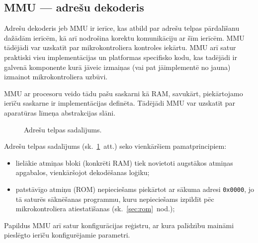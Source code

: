 

\subsection{MMU — adrešu dekoderis} \label{sec:mmu}
	Adrešu dekoderis jeb MMU ir ierīce, kas atbild par adrešu telpas
	pārdalīšanu dažādām ierīcēm, kā arī nodrošina korektu komunikāciju
	ar šīm ierīcēm. MMU tādējādi var uzskatīt par mikrokontroliera kontroles
	iekārtu. MMU arī satur praktiski visu implementācijas un platformas
	specifisko kodu, kas tadējādi ir galvenā komponente kurā jāveic izmaiņas
	(vai pat jāimplementē no jauna) izmainot mikrokontroliera uzbūvi.
	
	MMU ar procesoru veido tādu pašu saskarni kā RAM,
	savukārt, piekārtojamo ierīču saskarne ir implementācijas definēta.
	Tādējādi MMU var uzskatīt par aparatūras līmeņa abstrakcijas slāni.
	
	\begin{figure}[thp]
		\centering
		\def\svgwidth{0.9\textwidth}
		{\ttfamily\small}
		\caption{Adrešu telpas sadalījums.}
		\label{fig:memory-map}
	\end{figure}
	
	Adrešu telpas sadalījums (sk.~\ref{fig:memory-map}~att.) seko vienkāršiem pamatprincipiem:
	\begin{itemize}
		\item lielākie atmiņas bloki (konkrēti RAM) tiek novietoti augstākos
			atmiņas apgabalos, vienkāršojot dekodēšanas loģiku;
		\item patstāvīgo atmiņu (ROM) nepieciešams piekārtot ar sākuma
			adresi \texttt{0x0000}, jo tā saturēs sāknēšanas programmu,
			kuru nepieciešams izpildīt pēc mikrokontroliera atiestatīšanas
			(sk.~\ref{sec:rom}~nod.);
	\end{itemize}
	
	Papildus MMU arī satur konfigurācijas reģistru, ar kura palīdzību
	maināmi pieslēgto ierīču konfigurējamie parametri.
	\todo



